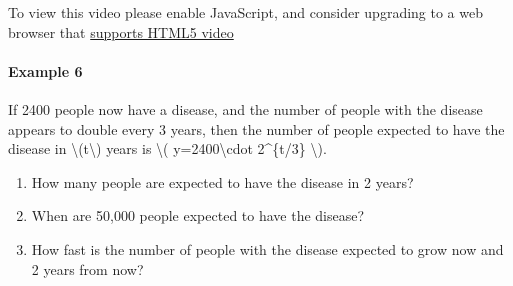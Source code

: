 To view this video please enable JavaScript, and consider upgrading to a
web browser that \href{http://videojs.com/html5-video-support/}{supports
HTML5 video}

\hypertarget{example-6}{%
\paragraph{Example 6}\label{example-6}}

If 2400 people now have a disease, and the number of people with the
disease appears to double every 3 years, then the number of people
expected to have the disease in \textbackslash{}(t\textbackslash{})
years is \textbackslash{}( y=2400\textbackslash{}cdot 2\^{}\{t/3\}
\textbackslash{}).

\begin{enumerate}
\tightlist
\item
  How many people are expected to have the disease in 2 years?
\item
  When are 50,000 people expected to have the disease?
\item
  How fast is the number of people with the disease expected to grow now
  and 2 years from now?
\end{enumerate}

